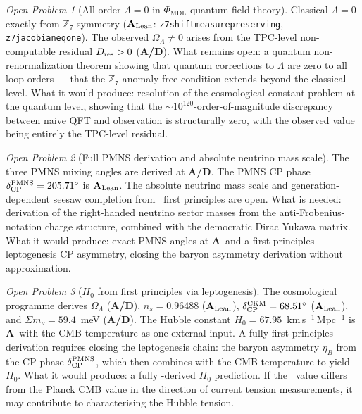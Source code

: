 \documentclass[11pt,openany]{book}
\theoremstyle{remark}
\newtheorem{openprob}{Open Problem}[chapter]
\newcommand{\GTE}{\text{GTE}}
\newcommand{\PHIMDL}{\Phi_{\mathrm{MDL}}}
\newcommand{\ZS}{\mathbb{Z}_7}
\newcommand{\lean}[1]{%
  \penalty-100
  \begingroup\def\_{\textunderscore\allowbreak}\texttt{#1}\endgroup}
\newcommand{\OmL}{\Omega_\Lambda}
\newcommand{\Dres}{D_{\rm res}}
\newcommand{\ns}{n_s}
\newcommand{\CatA}{\textbf{A}}
\newcommand{\CatAL}{\ensuremath{\textbf{A}_{\rm Lean}}}
\newcommand{\CatAD}{\textbf{A/D}}
\begin{document}
\begin{openprob}[All-order $\Lambda = 0$ in $\PHIMDL$ quantum field theory]
Classical $\Lambda = 0$ exactly from $\ZS$ symmetry (\CatAL:
\lean{z7\_shift\_measure\_preserving}, \lean{z7\_jacobian\_eq\_one}). The observed
$\OmL \neq 0$ arises from the TPC-level non-computable residual $\Dres > 0$
(\CatAD). What remains open: a quantum non-renormalization theorem showing that
quantum corrections to $\Lambda$ are zero to all loop orders --- that the $\ZS$
anomaly-free condition extends beyond the classical level. What it would produce:
resolution of the cosmological constant problem at the quantum level, showing that
the $\sim$$10^{120}$-order-of-magnitude discrepancy between naive QFT and observation
is structurally zero, with the observed value being entirely the TPC-level residual.
\end{openprob}

\begin{openprob}[Full PMNS derivation and absolute neutrino mass scale]
The three PMNS mixing angles are derived at \CatAD. The PMNS CP phase
$\delta^{\rm PMNS}_{\rm CP} = 205.71^\circ$ is \CatAL. The absolute neutrino mass
scale and generation-dependent seesaw completion from \GTE\ first principles are
open. What is needed: derivation of the right-handed neutrino sector masses from
the anti-Frobenius-notation charge structure, combined with the democratic Dirac
Yukawa matrix. What it would produce: exact PMNS angles at \CatA\ and a
first-principles leptogenesis CP asymmetry, closing the baryon asymmetry derivation
without approximation.
\end{openprob}

\begin{openprob}[$H_0$ from first principles via leptogenesis]
The cosmological programme derives $\OmL$ (\CatAD), $\ns = 0.96488$ (\CatAL),
$\delta^{\rm CKM}_{\rm CP} = 68.51^\circ$ (\CatAL), and $\Sigma m_\nu = 59.4$~meV
(\CatAD). The Hubble constant $H_0 = 67.95$~km\,s$^{-1}$\,Mpc$^{-1}$ is \CatA\
with the CMB temperature as one external input. A fully first-principles derivation
requires closing the leptogenesis chain: the baryon asymmetry $\eta_B$ from the
CP phase $\delta^{\rm PMNS}_{\rm CP}$, which then combines with the CMB temperature
to yield $H_0$. What it would produce: a fully \GTE-derived $H_0$ prediction.
If the \GTE\ value differs from the Planck CMB value in the direction of current
tension measurements, it may contribute to characterising the Hubble tension.
\end{openprob}
\end{document}
